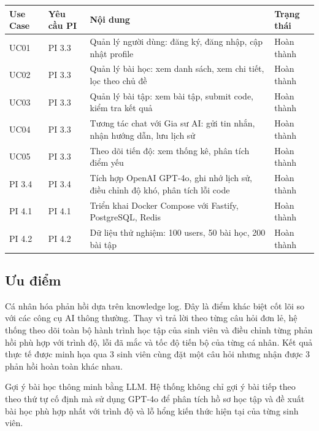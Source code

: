 \documentclass[../main.tex]{subfiles}
\begin{document}
{
\renewcommand{\arraystretch}{1.5}
\begin{tabularx}{\textwidth}{|p{2.0cm}|p{3cm}|>{\raggedright\arraybackslash}X|p{3cm}|}
\caption{Checklist thi công các Use Case theo yêu cầu PI}
\label{tab:checklist-thi-cong-cac-use-case-theo-yeu-cau-pi}
\\
\hline
\textbf{Use Case} & \textbf{Yêu cầu PI} & \textbf{Nội dung} & \textbf{Trạng thái} \\
\hline
UC01 & PI 3.3 & Quản lý người dùng: đăng ký, đăng nhập, cập nhật profile & Hoàn thành \\
\hline
UC02 & PI 3.3 & Quản lý bài học: xem danh sách, xem chi tiết, lọc theo chủ đề & Hoàn thành \\
\hline
UC03 & PI 3.3 & Quản lý bài tập: xem bài tập, submit code, kiểm tra kết quả & Hoàn thành \\
\hline
UC04 & PI 3.3 & Tương tác chat với Gia sư AI: gửi tin nhắn, nhận hướng dẫn, lưu lịch sử & Hoàn thành \\
\hline
UC05 & PI 3.3 & Theo dõi tiến độ: xem thống kê, phân tích điểm yếu & Hoàn thành \\
\hline
PI 3.4 & PI 3.4 & Tích hợp OpenAI GPT-4o, ghi nhớ lịch sử, điều chỉnh độ khó, phân tích lỗi code & Hoàn thành \\
\hline
PI 4.1 & PI 4.1 & Triển khai Docker Compose với Fastify, PostgreSQL, Redis & Hoàn thành \\
\hline
PI 4.2 & PI 4.2 & Dữ liệu thử nghiệm: 100 users, 50 bài học, 200 bài tập & Hoàn thành \\
\hline
\end{tabularx}
}

\subsection{Ưu điểm}

Cá nhân hóa phản hồi dựa trên knowledge log. Đây là điểm khác biệt cốt lõi so với các công cụ AI thông thường. Thay vì trả lời theo từng câu hỏi đơn lẻ, hệ thống theo dõi toàn bộ hành trình học tập của sinh viên và điều chỉnh từng phản hồi phù hợp với trình độ, lỗi đã mắc và tốc độ tiến bộ của từng cá nhân. Kết quả thực tế được minh họa qua 3 sinh viên cùng đặt một câu hỏi nhưng nhận được 3 phản hồi hoàn toàn khác nhau.

Gợi ý bài học thông minh bằng LLM. Hệ thống không chỉ gợi ý bài tiếp theo theo thứ tự cố định mà sử dụng GPT-4o để phân tích hồ sơ học tập và đề xuất bài học phù hợp nhất với trình độ và lỗ hổng kiến thức hiện tại của từng sinh viên.
\end{document}
